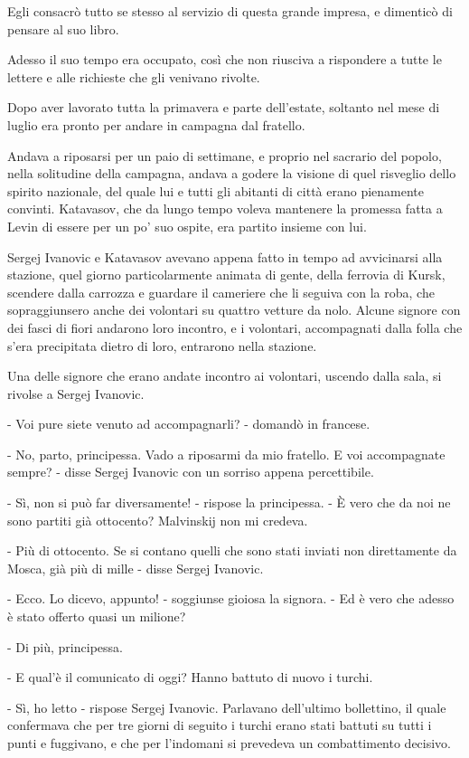 Egli consacrò tutto se stesso al servizio di questa grande impresa, e dimenticò di pensare al suo libro. 

Adesso il suo tempo era occupato, così che non riusciva a rispondere a tutte le lettere e alle richieste che gli venivano rivolte. 

Dopo aver lavorato tutta la primavera e parte dell'estate, soltanto nel mese di luglio era pronto per andare in campagna dal fratello. 

Andava a riposarsi per un paio di settimane, e proprio nel sacrario del popolo, nella solitudine della campagna, andava a godere la visione di quel risveglio dello spirito nazionale, del quale lui e tutti gli abitanti di città erano pienamente convinti. Katavasov, che da lungo tempo voleva mantenere la promessa fatta a Levin di essere per un po' suo ospite, era partito insieme con lui. 

Sergej Ivanovic e Katavasov avevano appena fatto in tempo ad avvicinarsi alla stazione, quel giorno particolarmente animata di gente, della ferrovia di Kursk, scendere dalla carrozza e guardare il cameriere che li seguiva con la roba, che sopraggiunsero anche dei volontari su quattro vetture da nolo. Alcune signore con dei fasci di fiori andarono loro incontro, e i volontari, accompagnati dalla folla che s'era precipitata dietro di loro, entrarono nella stazione. 

Una delle signore che erano andate incontro ai volontari, uscendo dalla sala, si rivolse a Sergej Ivanovic. 

- Voi pure siete venuto ad accompagnarli? - domandò in francese. 

- No, parto, principessa. Vado a riposarmi da mio fratello. E voi accompagnate sempre? - disse Sergej Ivanovic con un sorriso appena percettibile. 

- Sì, non si può far diversamente! - rispose la principessa. - È vero che da noi ne sono partiti già ottocento? Malvinskij non mi credeva. 

- Più di ottocento. Se si contano quelli che sono stati inviati non direttamente da Mosca, già più di mille - disse Sergej Ivanovic. 

- Ecco. Lo dicevo, appunto! - soggiunse gioiosa la signora. - Ed è vero che adesso è stato offerto quasi un milione? 

- Di più, principessa. 

- E qual'è il comunicato di oggi? Hanno battuto di nuovo i turchi. 

- Sì, ho letto - rispose Sergej Ivanovic. Parlavano dell'ultimo bollettino, il quale confermava che per tre giorni di seguito i turchi erano stati battuti su tutti i punti e fuggivano, e che per l'indomani si prevedeva un combattimento decisivo. 

